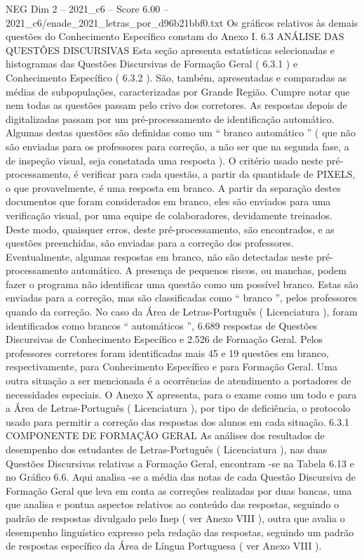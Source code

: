 \begin{textsample}{NEG Dim 2 – 2021\_c6 – Score 6.00 – 2021\_c6/enade\_2021\_letras\_por\_d96b21bbf0.txt}
Os gráficos relativos às demais questões do Conhecimento Específico constam do Anexo I. 6.3 ANÁLISE DAS QUESTÕES DISCURSIVAS Esta seção apresenta estatísticas selecionadas e histogramas das Questões Discursivas de Formação Geral ( 6.3.1 ) e Conhecimento Específico ( 6.3.2 ).
São, também, apresentadas e comparadas as médias de subpopulações, caracterizadas por Grande Região.
Cumpre notar que nem todas as questões passam pelo crivo dos corretores.
As respostas depois de digitalizadas passam por um pré-processamento de identificação automático.
Algumas destas questões são definidas como um “ branco automático ” ( que não são enviadas para os professores para correção, a não ser que na segunda fase, a de inspeção visual, seja constatada uma resposta ).
O critério usado neste pré-processamento, é verificar para cada questão, a partir da quantidade de PIXELS, o que provavelmente, é uma resposta em branco.
A partir da separação destes documentos que foram considerados em branco, eles são enviados para uma verificação visual, por uma equipe de colaboradores, devidamente treinados.
Deste modo, quaisquer erros, deste pré-processamento, são encontrados, e as questões preenchidas, são enviadas para a correção dos professores.
Eventualmente, algumas respostas em branco, não são detectadas neste pré-processamento automático.
A presença de pequenos riscos, ou manchas, podem fazer o programa não identificar uma questão como um possível branco.
Estas são enviadas para a correção, mas são classificadas como “ branco ”, pelos professores quando da correção.
No caso da Área de Letras-Português ( Licenciatura ), foram identificados como brancos “ automáticos ”, 6.689 respostas de Questões Discursivas de Conhecimento Específico e 2.526 de Formação Geral.
Pelos professores corretores foram identificadas mais 45 e 19 questões em branco, respectivamente, para Conhecimento Específico e para Formação Geral.
Uma outra situação a ser mencionada é a ocorrências de atendimento a portadores de necessidades especiais.
O Anexo X apresenta, para o exame como um todo e para a Área de Letras-Português ( Licenciatura ), por tipo de deficiência, o protocolo usado para permitir a correção das respostas dos alunos em cada situação. 6.3.1 COMPONENTE DE FORMAÇÃO GERAL As análises dos resultados de desempenho dos estudantes de Letras-Português ( Licenciatura ), nas duas Questões Discursivas relativas a Formação Geral, encontram -se na Tabela 6.13 e no Gráfico 6.6.
Aqui analisa -se a média das notas de cada Questão Discursiva de Formação Geral que leva em conta as correções realizadas por duas bancas, uma que analisa e pontua aspectos relativos ao conteúdo das respostas, seguindo o padrão de respostas divulgado pelo Inep ( ver Anexo VIII ), outra que avalia o desempenho linguístico expresso pela redação das respostas, seguindo um padrão de respostas específico da Área de Língua Portuguesa ( ver Anexo VIII ).

\end{textsample}
